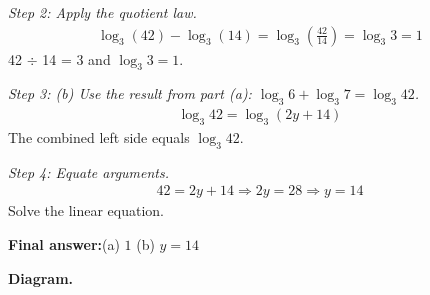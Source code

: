 \documentclass[11pt]{article}
\begin{document}
\textit{Step 2: Apply the quotient law.}
\[\begin{gathered}
\log_3(42) - \log_3(14) = \log_3\!\left(\frac{42}{14}\right) = \log_3 3 = 1
\end{gathered}\]
42 $\div$ 14 = 3 and \( \log_3 3 = 1 \).

\textit{Step 3: (b) Use the result from part (a): \( \log_3 6 + \log_3 7 = \log_3 42 \).}
\[\begin{gathered}
\log_3 42 = \log_3(2y + 14)
\end{gathered}\]
The combined left side equals \( \log_3 42 \).

\textit{Step 4: Equate arguments.}
\[\begin{gathered}
42 = 2y + 14 \Rightarrow 2y = 28 \Rightarrow y = 14
\end{gathered}\]
Solve the linear equation.

\begin{answerbox}
\textbf{Final answer:}\quad (a) \(\displaystyle  1 \) \quad  (b) \(\displaystyle  y = 14 \)
\end{answerbox}
\textbf{Diagram.}
\end{document}
